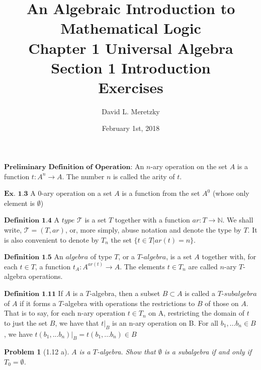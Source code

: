 \documentclass{article}
\title{ \vspace{-10ex} %
An Algebraic Introduction to Mathematical Logic\\
Chapter 1 Universal Algebra \\
Section 1 Introduction \\
Exercises 
}
\author{David L. Meretzky
}
\date{%
February 1st, 2018
}
\theoremstyle{problemstyle}
\newtheorem{problem}{Problem}
\begin{document}
\maketitle

\begin{flushleft}
$\textbf{Preliminary Definition of Operation:}$
An $n$-ary operation on the set $A$ is a function $t:A^{n}\rightarrow A$. The number $n$ is called the arity of $t$.
\end{flushleft}
\begin{flushleft}
$\textbf{Ex. 1.3}$ A $0$-ary operation on a set $A$ is a function from the set $A^0$ (whose only element is $\emptyset$)
\end{flushleft}
\begin{flushleft}
$\textbf{Definition 1.4}$ A $type$ $\mathscr{T}$ is a set $T$ together with a function $ar:T\rightarrow\mathbb{N}$. We shall write, $\mathscr{T} = (T,ar)$, or, more simply, abuse notation and denote the type by $T$. It is also convenient to denote by $T_n$ the set $\{t \in T|ar(t) = n\}.$
\end{flushleft}
\begin{flushleft}
$\textbf{Definition 1.5}$ An $algebra$ of type $T$, or a $T$-$algebra$, is a set $A$ together with, for each $t \in T$, a function $t_A:A^{ar(t)}\rightarrow A$.  The elements $t \in T_n$ are called $n$-ary $T$-algebra operations. 
\end{flushleft}

\begin{flushleft}
$\textbf{Definition 1.11}$ If $A$ is a $T$-algebra, then a subset $B \subset A$ is called a $T$-$subalgebra$ of $A$ if it forms a $T$-algebra with operations the restrictions to $B$ of those on $A$. That is to say, for each n-ary operation $t \in T_{n}$ on A, restricting the domain of $t$ to just the set $B$, we have that $t|_B$ is an n-ary operation on B. For all $b_1, ... b_n \in B$, we have $t(b_1, ... b_n)|_B  = t(b_1, ... b_n) \in B$
\end{flushleft}

\begin{problem}[1.12 a] 
$A$ is a $T$-algebra. Show that $\emptyset$ is a subalgebra if and only if $T_{0} = \emptyset$. 
\end{problem}
\end{document}

